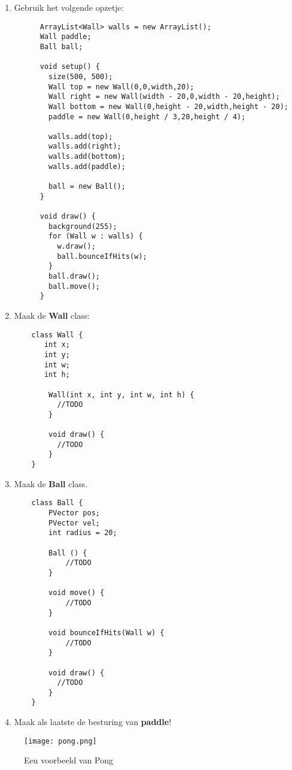 \documentclass[../syllabus.tex]{subfiles}
\begin{document}
\begin{enumerate}
    \item Gebruik het volgende opzetje:
    \begin{lstlisting}
      ArrayList<Wall> walls = new ArrayList();
      Wall paddle;
      Ball ball;
      
      void setup() {
        size(500, 500);
        Wall top = new Wall(0,0,width,20);
        Wall right = new Wall(width - 20,0,width - 20,height);
        Wall bottom = new Wall(0,height - 20,width,height - 20);
        paddle = new Wall(0,height / 3,20,height / 4);
        
        walls.add(top);
        walls.add(right);
        walls.add(bottom);
        walls.add(paddle);
       
        ball = new Ball();
      }
      
      void draw() {
        background(255);
        for (Wall w : walls) {
          w.draw();
          ball.bounceIfHits(w);
        }
        ball.draw();
        ball.move();
      }
    \end{lstlisting}
    
    \item Maak de \textbf{Wall} class:
    \begin{lstlisting}
    class Wall {
       int x;
       int y;
       int w;
       int h;
       
        Wall(int x, int y, int w, int h) {
          //TODO
        }
        
        void draw() {
          //TODO
        }
    }  
    \end{lstlisting}
    \item Maak de \textbf{Ball} class.
    \begin{lstlisting}
    class Ball {
        PVector pos;
        PVector vel; 
        int radius = 20;
        
        Ball () {
            //TODO
        }
        
        void move() {
            //TODO
        }
        
        void bounceIfHits(Wall w) {
            //TODO
        }
        
        void draw() {
          //TODO
        }
    }
    \end{lstlisting}
    \item Maak als laatste de besturing van \textbf{paddle}!
\end{enumerate}
\begin{figure}[H]
	\centering
	\texttt{[image: pong.png]}
	\caption{Een voorbeeld van Pong}
	\label{fig:koch}
\end{figure}
\end{document}

